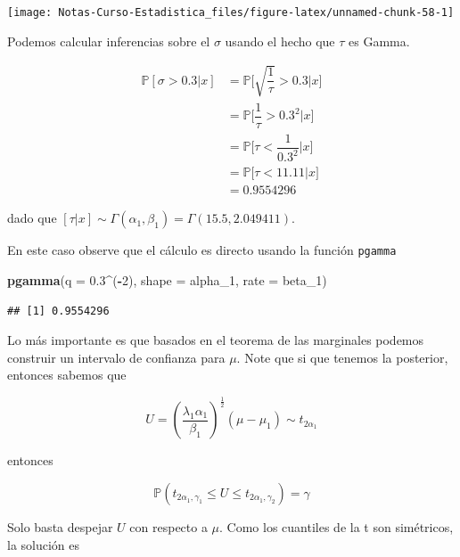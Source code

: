 \documentclass[
  12pt,
]{book}
\newenvironment{Shaded}{\begin{snugshade}}{\end{snugshade}}
\newcommand{\DataTypeTok}[1]{\textcolor[rgb]{0.13,0.29,0.53}{#1}}
\newcommand{\DecValTok}[1]{\textcolor[rgb]{0.00,0.00,0.81}{#1}}
\newcommand{\FloatTok}[1]{\textcolor[rgb]{0.00,0.00,0.81}{#1}}
\newcommand{\KeywordTok}[1]{\textcolor[rgb]{0.13,0.29,0.53}{\textbf{#1}}}
\newcommand{\NormalTok}[1]{#1}
\newcommand{\OperatorTok}[1]{\textcolor[rgb]{0.81,0.36,0.00}{\textbf{#1}}}
\begin{document}
\begin{center}\texttt{[image: Notas-Curso-Estadistica\_files/figure-latex/unnamed-chunk-58-1]} \end{center}

Podemos calcular inferencias sobre el \(\sigma\) usando el hecho que \(\tau\)
es Gamma.

\begin{align*}
\mathbb P[\sigma>0.3|x] & = \mathbb P\bigg[\sqrt{\dfrac 1\tau} >0.3\bigg|x\bigg]\\
& = \mathbb P\bigg[\dfrac 1\tau >0.3^2\bigg|x\bigg]\\ 
& = \mathbb P\bigg[\tau <\dfrac 1{0.3^2}\bigg|x\bigg] \\ 
& = \mathbb P\bigg[\tau <11.11\bigg|x\bigg] \\ 
&=0.9554296
\end{align*}

dado que \([\tau|x] \sim \Gamma(\alpha_1,\beta_1) = \Gamma(15.5,2.049411)\).

En este caso observe que el cálculo es directo usando la función \texttt{pgamma}

\begin{Shaded}
\begin{Highlighting}[]
\KeywordTok{pgamma}\NormalTok{(}\DataTypeTok{q =} \FloatTok{0.3}\OperatorTok{\^{}}\NormalTok{(}\OperatorTok{{-}}\DecValTok{2}\NormalTok{), }\DataTypeTok{shape =}\NormalTok{ alpha\_}\DecValTok{1}\NormalTok{, }\DataTypeTok{rate =}\NormalTok{ beta\_}\DecValTok{1}\NormalTok{)}
\end{Highlighting}
\end{Shaded}

\begin{verbatim}
## [1] 0.9554296
\end{verbatim}

Lo más importante es que basados en el teorema de las marginales podemos
construir un intervalo de confianza para \(\mu\). Note que si que tenemos la
posterior, entonces sabemos que

\[U = \left(\dfrac{\lambda_1\alpha_1}{\beta_1}\right)^{\frac 12}(\mu-\mu_1) \sim t_{2\alpha_1} \]

entonces

\begin{equation*}
\mathbb P \left(t_{2\alpha_1, \gamma_1} \leq U \leq t_{2\alpha_1,
\gamma_2}\right) = \gamma
\end{equation*}

Solo basta despejar \(U\) con respecto a \(\mu\). Como los cuantiles de la t son
simétricos, la solución es
\end{document}
